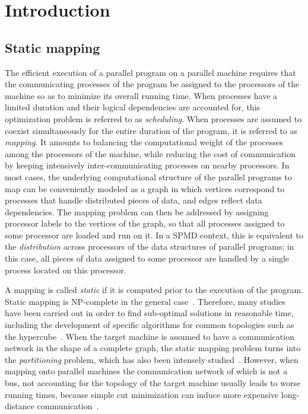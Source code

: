 
\section{Introduction}

\subsection{Static mapping}

The efficient execution of a parallel program on a parallel machine
requires that the communicating processes of the program be assigned
to the processors of the machine so as to minimize its overall running
time.
When processes have a limited duration and their logical dependencies
are accounted for, this optimization problem is referred to as
\emph{scheduling}.
When processes are assumed to coexist simultaneously for the entire
duration of the program, it is referred to as \emph{mapping}. It
amounts to balancing the computational weight of the processes among the
processors of the machine, while reducing the cost of communication by
keeping intensively inter-communicating processes on nearby
processors.
In most cases, the underlying computational structure of the parallel
programs to map can be conveniently modeled as a graph in which
vertices correspond to processes that handle distributed pieces of
data, and edges reflect data dependencies. The mapping problem can
then be addressed by assigning processor labels to the vertices of the
graph, so that all processes assigned to some processor are loaded and
run on it.
In a SPMD context, this is equivalent to the \emph{distribution\/}
across processors of the data structures of parallel programs; in this
case, all pieces of data assigned to some processor are handled by a
single process located on this processor.

A mapping is called \emph{static\/} if it is computed prior to the
execution of the program. Static mapping is NP-complete in the general
case~\cite{gajo79}. Therefore, many studies have been carried out in
order to find sub-optimal solutions in reasonable time, including
the development of specific algorithms for common topologies such
as the hypercube~\cite{errasa90,hamm92}.
When the target machine is assumed to have a communication network in
the shape of a complete graph, the static mapping problem turns into
the \emph{partitioning\/} problem, which has also been intensely
studied~\cite{basi94,hele93a,kaku95a,kaku95c,posili90}.
However, when mapping onto parallel machines the communication network
of which is not a bus, not accounting for the topology of the target
machine usually leads to worse running times, because simple cut
minimization can induce more expensive long-distance
communication~\cite{hamm92,wacrevjo95}.

